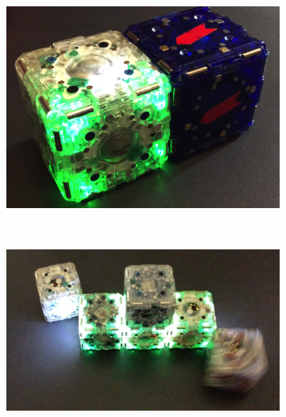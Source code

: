 \begin{figure}[t]
	\centering
	\begin{subfigure}[b]{1.6 in}
		\includegraphics[width=.9\linewidth]{Figures/mTagsCover.png}
		\subcaption{}
	\end{subfigure}
	~
	\begin{subfigure}[b]{1.5 in}
		
		
		\resizebox{1.5 in}{1.25 in}
		{
			\begin{tikzpicture}[x=(220:1cm), y=(-40:1cm), z=(90:0.707cm)]
			
			
			
			\end{tikzpicture}
		}
		
		\subcaption{}
	\end{subfigure}
	
	\centering
	\begin{subfigure}[b]{\linewidth}
		\includegraphics[width=.95\linewidth]{figures/ActualLine_3.png}
	\end{subfigure}
	

\end{figure}
